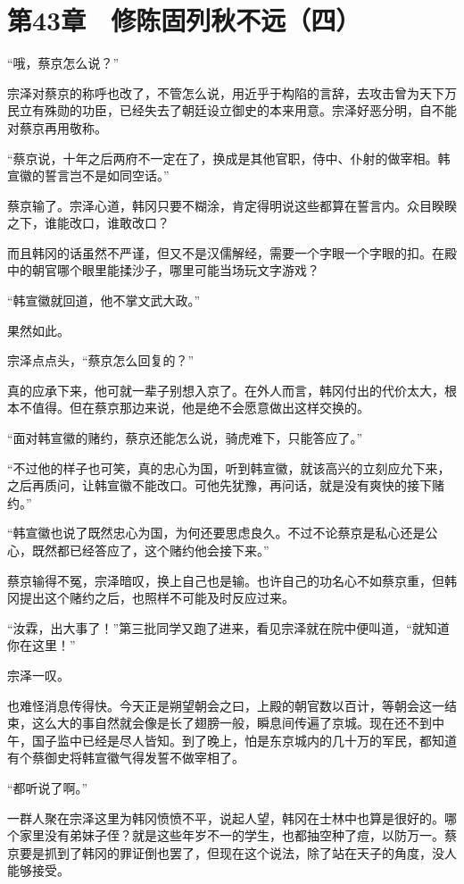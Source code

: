 \section{第43章　修陈固列秋不远（四）}

“哦，蔡京怎么说？”

宗泽对蔡京的称呼也改了，不管怎么说，用近乎于构陷的言辞，去攻击曾为天下万民立有殊勋的功臣，已经失去了朝廷设立御史的本来用意。宗泽好恶分明，自不能对蔡京再用敬称。

“蔡京说，十年之后两府不一定在了，换成是其他官职，侍中、仆射的做宰相。韩宣徽的誓言岂不是如同空话。”

蔡京输了。宗泽心道，韩冈只要不糊涂，肯定得明说这些都算在誓言内。众目睽睽之下，谁能改口，谁敢改口？

而且韩冈的话虽然不严谨，但又不是汉儒解经，需要一个字眼一个字眼的扣。在殿中的朝官哪个眼里能揉沙子，哪里可能当场玩文字游戏？

“韩宣徽就回道，他不掌文武大政。”

果然如此。

宗泽点点头，“蔡京怎么回复的？”

真的应承下来，他可就一辈子别想入京了。在外人而言，韩冈付出的代价太大，根本不值得。但在蔡京那边来说，他是绝不会愿意做出这样交换的。

“面对韩宣徽的赌约，蔡京还能怎么说，骑虎难下，只能答应了。”

“不过他的样子也可笑，真的忠心为国，听到韩宣徽，就该高兴的立刻应允下来，之后再质问，让韩宣徽不能改口。可他先犹豫，再问话，就是没有爽快的接下赌约。”

“韩宣徽也说了既然忠心为国，为何还要思虑良久。不过不论蔡京是私心还是公心，既然都已经答应了，这个赌约他会接下来。”

蔡京输得不冤，宗泽暗叹，换上自己也是输。也许自己的功名心不如蔡京重，但韩冈提出这个赌约之后，也照样不可能及时反应过来。

“汝霖，出大事了！”第三批同学又跑了进来，看见宗泽就在院中便叫道，“就知道你在这里！”

宗泽一叹。

也难怪消息传得快。今天正是朔望朝会之曰，上殿的朝官数以百计，等朝会这一结束，这么大的事自然就会像是长了翅膀一般，瞬息间传遍了京城。现在还不到中午，国子监中已经是尽人皆知。到了晚上，怕是东京城内的几十万的军民，都知道有个蔡御史将韩宣徽气得发誓不做宰相了。

“都听说了啊。”

一群人聚在宗泽这里为韩冈愤愤不平，说起人望，韩冈在士林中也算是很好的。哪个家里没有弟妹子侄？就是这些年岁不一的学生，也都抽空种了痘，以防万一。蔡京要是抓到了韩冈的罪证倒也罢了，但现在这个说法，除了站在天子的角度，没人能够接受。

